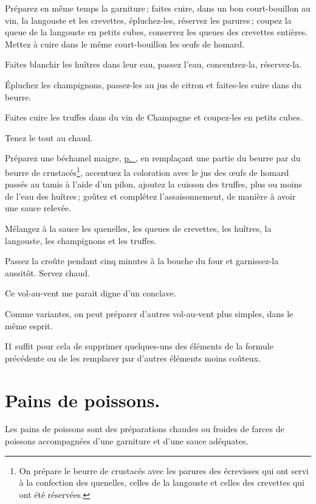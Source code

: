 Préparez en même temps la garniture ; faites cuire, dans un bon court-bouillon
au vin, la langouste et les crevettes, épluchez-les, réservez les parures ;
coupez la queue de la langouste en petits cubes, conservez les queues des
crevettes entières. Mettez à cuire dans le même court-bouillon les œufs de
homard.

Faites blanchir les huîtres dans leur eau, passez l'eau, concentrez-la,
réservez-la.

Épluchez les champignons, passez-les au jus de citron et faites-les cuire dans
du beurre.

Faites cuire les truffes dans du vin de Champagne et coupez-les en petits
cubes.

Tenez le tout au chaud.

Préparez une béchamel maigre, \hyperlink{p0269}{p. \pageref{pg0269}}, en
remplaçant une partie du beurre par du beurre de crustacés\footnote{
On prépare le beurre de crustacés avec les parures des écrevisses qui ont servi
à la confection des quenelles, celles de la langouste et celles des crevettes
qui ont été réservées.}, accentuez la coloration avec le jus des œufs de homard
passés au tamis à l’aide d'un pilon, ajoutez la cuisson des truffes, plus ou
moins de l'eau des huîtres ; goûtez et complétez l'assaisonnement, de manière
à avoir une sauce relevée.

Mélangez à la sauce les quenelles, les queues de crevettes, les huîtres, la
langouste, les champignons et les truffes.

Passez la croûte pendant cinq minutes à la bouche du four et garnissez-la
aussitôt. Servez chaud.

Ce vol-au-vent me parait digne d'un conclave.

\sk

Comme variantes, on peut préparer d'autres vol-au-vent plus simples, dans le
même esprit.

I1 suffit pour cela de supprimer quelques-uns des éléments de la formule
précédente ou de les remplacer par d'autres éléments moins coûteux.

\section*{\centering Pains de poissons.}

Les pains de poissons sont des préparations chaudes ou froides de farces de
poissons accompagnées d'une garniture et d’une sauce adéquates.

